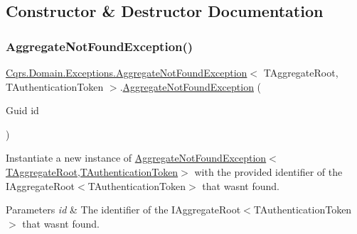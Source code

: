 \subsection{Constructor \& Destructor Documentation}
\mbox{\label{classCqrs_1_1Domain_1_1Exceptions_1_1AggregateNotFoundException_a44057befbb31c652727d04c5b34211ee_a44057befbb31c652727d04c5b34211ee}} 
\subsubsection{\texorpdfstring{Aggregate\+Not\+Found\+Exception()}{AggregateNotFoundException()}}
{\footnotesize\ttfamily \hyperlink{classCqrs_1_1Domain_1_1Exceptions_1_1AggregateNotFoundException}{Cqrs.\+Domain.\+Exceptions.\+Aggregate\+Not\+Found\+Exception}$<$ T\+Aggregate\+Root, T\+Authentication\+Token $>$.\hyperlink{classCqrs_1_1Domain_1_1Exceptions_1_1AggregateNotFoundException}{Aggregate\+Not\+Found\+Exception} (\begin{DoxyParamCaption}\item[{Guid}]{id }\end{DoxyParamCaption})}



Instantiate a new instance of \hyperlink{classCqrs_1_1Domain_1_1Exceptions_1_1AggregateNotFoundException_a44057befbb31c652727d04c5b34211ee_a44057befbb31c652727d04c5b34211ee}{Aggregate\+Not\+Found\+Exception$<$\+T\+Aggregate\+Root,\+T\+Authentication\+Token$>$} with the provided identifier of the I\+Aggregate\+Root$<$\+T\+Authentication\+Token$>$ that wasn\textquotesingle{}t found. 


\begin{DoxyParams}{Parameters}
{\em id} & The identifier of the I\+Aggregate\+Root$<$\+T\+Authentication\+Token$>$ that wasn\textquotesingle{}t found.\\
\hline
\end{DoxyParams}


